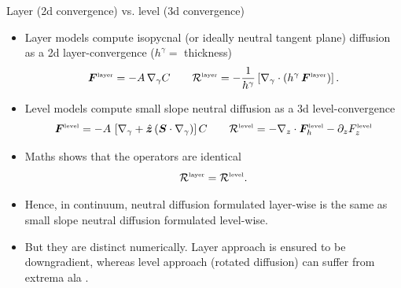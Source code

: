 \documentclass{beamer}
\begin{document}
\begin{frame}{Layer (2d convergence) vs. level (3d convergence)}

\begin{itemize}

\item[$\star$] Layer models compute isopycnal (or ideally neutral tangent plane) diffusion as a 2d layer-convergence 
($h^{\gamma} = $ thickness)
\begin{equation}
     {\bm F}^{\mbox{\tiny layer}}= - A \, \nabla_{\gamma} C
     \qquad 
      {\cal R}^{\mbox{\tiny layer}} = 
     -\frac{1}{h^{\gamma} }  
     \left[ \nabla_{\gamma} \cdot (h^{\gamma} \,
     {\bm F}^{\mbox{\tiny layer}} ) \right].
\end{equation}

\item[$\star$] Level models compute small slope neutral diffusion as a 3d level-convergence
\begin{equation}
   {\bm F}^{\mbox{\tiny level}} 
  =  -A \, \left[ \nabla_{\gamma}  + \hat{\bm z} \, ({\bm S} \cdot \nabla_{\gamma} ) \right] C  
   \qquad 
   {\cal R}^{\mbox{\tiny level}} 
    = -\nabla_{z} \cdot {\bm F}_{h}^{\mbox{\tiny level}}   
    - \partial_{z} F_{z}^{\mbox{\tiny level}}
\end{equation}

\item[$\star$] Maths shows that the operators are identical
\parencite{SMGbook,McDougall_etal_geometry}  
\begin{equation}
 {\cal R}^{\mbox{\tiny layer}}  = {\cal R}^{\mbox{\tiny level}}.
\end{equation}

\item[$\star$] Hence, in continuum, neutral diffusion formulated
  layer-wise is the same as small slope neutral diffusion formulated
  level-wise.

\item[$\star$] But they are distinct numerically. Layer approach is
  ensured to be downgradient, whereas level approach (rotated
  diffusion) can suffer from extrema ala \textcite{Beckersetal1998}.


\end{itemize}

\end{frame}
\end{document}
